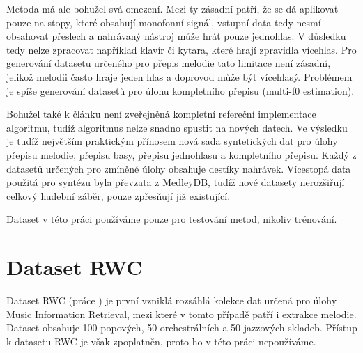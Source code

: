 Metoda má ale bohužel svá omezení. Mezi ty zásadní patří, že se dá aplikovat pouze na stopy, které obsahují monofonní signál, vstupní data tedy nesmí obsahovat přeslech a nahrávaný nástroj může hrát pouze jednohlas. V důsledku tedy nelze zpracovat například klavír či kytara, které hrají zpravidla vícehlas. Pro generování datasetu určeného pro přepis melodie tato limitace není zásadní, jelikož melodii často hraje jeden hlas a doprovod může být vícehlasý. Problémem je  spíše generování datasetů pro úlohu kompletního přepisu (multi-f0 estimation).

Bohužel také k článku není zveřejněná kompletní refereční implementace algoritmu, tudíž algoritmus nelze snadno spustit na nových datech. Ve výsledku je tudíž největším praktickým přínosem nová sada syntetických dat pro úlohy přepisu melodie, přepisu basy, přepisu jednohlasu a kompletního přepisu. Každý z datasetů určených pro zmíněné úlohy obsahuje destíky nahrávek. Vícestopá data použitá pro syntézu byla převzata z MedleyDB, tudíž nové datasety nerozšiřují celkový hudební záběr, pouze zpřesňují již existující.

Dataset v této práci používáme pouze pro testování metod, nikoliv trénování.



\section{Dataset RWC}

Dataset RWC (práce \cite{Goto2002}) je první vzniklá rozsáhlá kolekce dat určená pro úlohy Music Information Retrieval, mezi které v tomto případě patří i extrakce melodie. Dataset obsahuje 100 popových, 50 orchestrálních a 50 jazzových skladeb. Přístup k datasetu RWC je však zpoplatněn, proto ho v této práci nepoužíváme.
